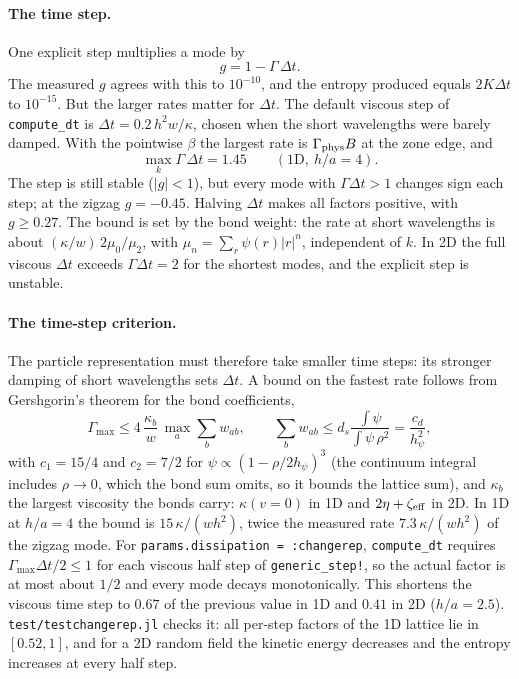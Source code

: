 \documentclass[11pt,aps,preprint,nofootinbib,superscriptaddress,tightenlines]{revtex4-2}
\def\st{\begin{equation}}
\def\stp{\end{equation}}
\let\oldparagraph\paragraph
\renewcommand{\paragraph}{\par\bigskip\oldparagraph}
\begin{document}
\paragraph{The time step.}  One explicit step multiplies a mode by
\st
g=1-\Gamma\,\Delta t .
\stp
The measured $g$ agrees with this to $10^{-10}$, and the entropy produced equals
$2K\Delta t$ to $10^{-15}$.  But the larger rates matter for $\Delta t$.  The
default viscous step of \texttt{compute\_dt} is $\Delta t=0.2\,h^2w/\kappa$,
chosen when the short wavelengths were barely damped.  With the pointwise
$\beta$ the largest rate is $\Gamma_{\rm phys}B$ at the zone edge, and
\st
\max_k\Gamma\,\Delta t=1.45\qquad(\text{1D},\ h/a=4).
\stp
The step is still stable ($|g|<1$), but every mode with $\Gamma\Delta t>1$ changes
sign each step; at the zigzag $g=-0.45$.  Halving $\Delta t$ makes all factors
positive, with $g\ge0.27$.  The bound is set by the bond weight: the rate at
short wavelengths is about $(\kappa/w)\,2\mu_0/\mu_2$, with
$\mu_n=\sum_r\psi(r)|r|^n$, independent of $k$.  In 2D the full viscous $\Delta t$
exceeds $\Gamma\Delta t=2$ for the shortest modes, and the explicit step is
unstable.

\paragraph{The time-step criterion.}  The particle representation must
therefore take smaller time steps: its stronger damping of short wavelengths
sets $\Delta t$.  A bound on the fastest rate follows from Gershgorin's theorem
for the bond coefficients,
\st
\Gamma_{\max}\le4\,\frac{\kappa_b}{w}\,\max_a\sum_bw_{ab},\qquad
\sum_bw_{ab}\le d_s\frac{\int\psi}{\int\psi\,\rho^2}=\frac{c_d}{h_\psi^2},
\label{Gammabound}
\stp
with $c_1=15/4$ and $c_2=7/2$ for $\psi\propto(1-\rho/2h_\psi)^3$ (the continuum
integral includes $\rho\to0$, which the bond sum omits, so it bounds the lattice
sum), and $\kappa_b$ the largest viscosity the bonds carry: $\kappa(v=0)$ in 1D and
$2\eta+\zeta_{\rm eff}$ in 2D.  In 1D at $h/a=4$ the bound is $15\,\kappa/(wh^2)$,
twice the measured rate $7.3\,\kappa/(wh^2)$ of the zigzag mode.  For
\texttt{params.dissipation = :changerep}, \texttt{compute\_dt} requires
$\Gamma_{\max}\Delta t/2\le1$ for each viscous half step of \texttt{generic\_step!},
so the actual factor is at most about $1/2$ and every mode decays
monotonically.  This shortens the viscous time step to $0.67$ of the previous
value in 1D and $0.41$ in 2D ($h/a=2.5$).  \texttt{test/testchangerep.jl} checks it:
all per-step factors of the 1D lattice lie in $[0.52,1]$, and for a 2D random
field the kinetic energy decreases and the entropy increases at every half
step.
\end{document}
